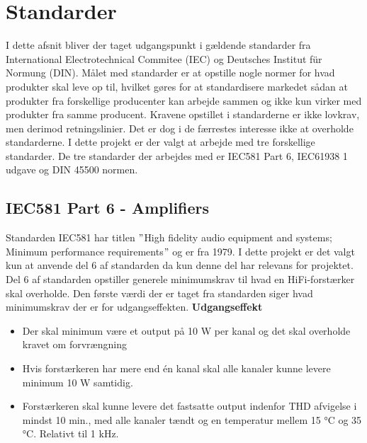 \section{Standarder}
\label{standarder}
I dette afsnit bliver der taget udgangspunkt i gældende standarder fra International Electrotechnical Commitee (IEC) og Deutsches Institut f\"{u}r Normung (DIN). Målet med standarder er at opstille nogle normer for hvad produkter skal leve op til, hvilket gøres for at standardisere markedet sådan at produkter fra forskellige producenter kan arbejde sammen og ikke kun virker med produkter fra samme producent. Kravene opstillet i standarderne er ikke lovkrav, men derimod retningslinier. Det er dog i de færrestes interesse ikke at overholde standarderne.
\newline
\newline
I dette projekt er der valgt at arbejde med tre forskellige standarder. De tre standarder der arbejdes med er IEC581 Part 6, IEC61938 1 udgave og DIN 45500 normen.


\subsection*{IEC581 Part 6 - Amplifiers}
\label{IEC581}
Standarden IEC581 har titlen $"$High fidelity audio equipment and systems; Minimum performance requirements$"$ og er fra 1979. I dette projekt er det valgt kun at anvende del 6 af standarden da kun denne del har relevans for projektet. Del 6 af standarden opstiller generele minimumskrav til hvad en HiFi-forstærker skal overholde. \cite{IEC581-6}%
\newline
\newline
Den første værdi der er taget fra standarden siger hvad minimumskrav der er for udgangseffekten.
\newline
\newline
\textbf{Udgangseffekt}
\begin{itemize}
\item Der skal minimum være et output på 10 W per kanal og det skal overholde kravet om forvrængning
\item Hvis forstærkeren har mere end én kanal skal alle kanaler kunne levere minimum 10 W samtidig.
\item Forstærkeren skal kunne levere det fastsatte output indenfor THD afvigelse i mindst 10 min., med alle kanaler tændt og en temperatur mellem 15 °C og 35 °C. Relativt til 1 kHz.
\end{itemize}

